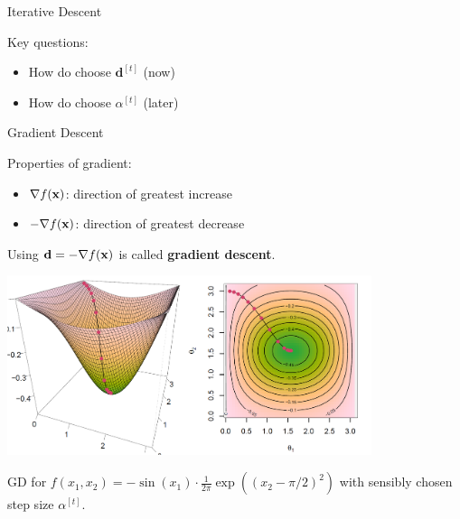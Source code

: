 \documentclass[11pt,compress,t,notes=noshow, xcolor=table]{beamer}
\begin{document}
\begin{vbframe}{Iterative Descent}
	\lz 

	Key questions: 
	\begin{itemize}
		\item How do choose $\mathbf{d}^{[t]}$ (now)
		\item How do choose $\alpha^{[t]}$ (later)
	\end{itemize}

\end{vbframe}


\begin{vbframe}{Gradient Descent}

	Properties of gradient: 

	\begin{itemize}
		\item $\nabla f(\mathbf{x})$: direction of greatest increase
		\item $- \nabla f(\mathbf{x})$: direction of greatest decrease
	\end{itemize}

	\vspace*{0.3cm}

	Using $\mathbf{d} = - \nabla f(\mathbf{x})$ is called \textbf{gradient descent}. 

	\begin{center}
		\includegraphics[width = 0.8\textwidth]{figure_man/example-descent1.png} \\
		\begin{footnotesize}
			GD for $f(x_1, x_2) = - \sin(x_1) \cdot \frac{1}{2\pi} \exp\left( (x_2 - \pi / 2)^2 \right)$ with sensibly chosen step size $\alpha^{[t]}$. 
		\end{footnotesize}
	\end{center}


\end{vbframe}
\end{document}
